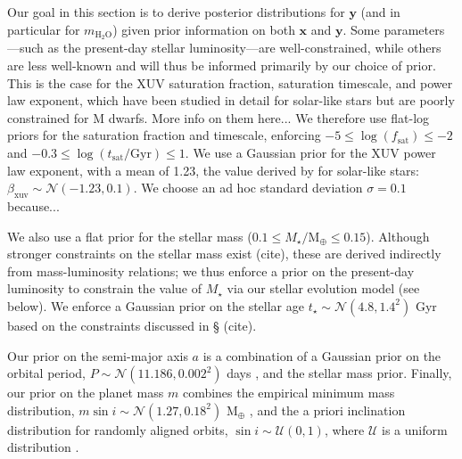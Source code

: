 \documentclass[]{emulateapj}
\newcommand{\note}[1]{{\color{red} #1}}
\newcommand{\cn}{\note{(cite)}}
\begin{document}
Our goal in this section is to derive posterior distributions for $\mathbf{y}$ (and in particular for $m_\mathrm{H_2O}$) 
given prior information on both 
$\mathbf{x}$ and $\mathbf{y}$. Some parameters---such as the present-day stellar luminosity---are well-constrained,
while others are less well-known and will thus be informed primarily by our choice of prior. This is the case for
the XUV saturation fraction, saturation timescale, and power law exponent, which have been studied in detail 
for solar-like stars \citep{Ribas05} but are poorly constrained for M dwarfs. \note{More info on them here...}
We therefore use flat-log priors for the saturation fraction and timescale, enforcing
$-5 \leq \log(f_\mathrm{sat}) \leq -2$ and $-0.3 \leq \log(t_\mathrm{sat} / \mathrm{Gyr}) \leq 1$. We use
a Gaussian prior for the XUV power law exponent, with a mean of 1.23, the value derived by \citep{Ribas05} for
solar-like stars: $\beta_\mathrm{xuv} \sim \mathcal{N}(-1.23, 0.1)$. We choose an ad hoc standard deviation
$\sigma = 0.1$ \note{because...}

We also use a flat prior for the stellar mass ($0.1 \leq M_\star / \mathrm{M}_\oplus \leq 0.15$).
Although stronger constraints on the stellar mass exist \cn, these are derived indirectly from mass-luminosity relations; we thus
enforce a prior on the present-day luminosity to constrain the value of $M_\star$ via our stellar evolution model (see below).
We enforce a Gaussian prior on the stellar age $t_\star \sim \mathcal{N}(4.8, 1.4^2)$ Gyr based on the constraints discussed
in \S\cn. 

Our prior on the semi-major axis $a$ is a combination of a Gaussian prior on the orbital period, 
$P \sim \mathcal{N}(11.186, 0.002^2)$ days \citep{AngladaEscude16}, and the stellar mass prior. 
Finally, our prior on the planet mass $m$ combines the empirical minimum mass distribution,
$m\sin i \sim \mathcal{N}(1.27, 0.18^2)$ M$_\oplus$ \citep{AngladaEscude16}, and the a priori inclination distribution
for randomly aligned orbits, 
$\sin i \sim \mathcal{U}(0, 1)$, where $\mathcal{U}$ is a uniform distribution \citep[e.g.,][]{Luger17}.
\end{document}
